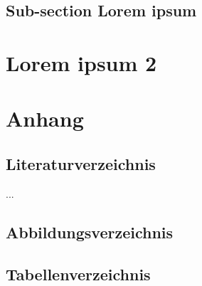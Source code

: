 \documentclass[12pt, twoside]{extarticle}
\begin{document}
\lipsum[2]

\newpage

\subsection{Sub-section Lorem ipsum}

\lipsum[2]

\newpage

\section{Lorem ipsum 2}

\lipsum[2]

\section{Anhang}

\subsection{Literaturverzeichnis}

...

\newpage

\subsection{Abbildungsverzeichnis}

\listoffigures

\newpage

\subsection{Tabellenverzeichnis}

\listoftables

\newpage
\end{document}
